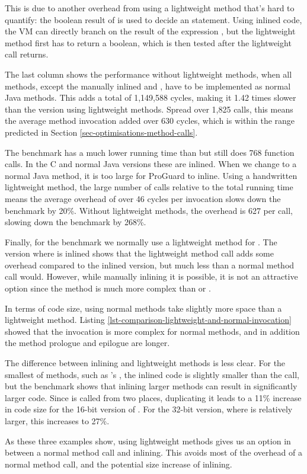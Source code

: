 This is due to another overhead from using a lightweight method that's hard to quantify: the boolean result of  is used to decide an  statement. Using inlined code, the VM can directly branch on the result of the expression , but the lightweight method first has to return a boolean, which is then tested after the lightweight call returns.

The last column shows the performance without lightweight methods, when all methods, except the manually inlined  and , have to be implemented as normal Java methods. This adds a total of 1,149,588 cycles, making it 1.42 times slower than the version using lightweight methods. Spread over 1,825 calls, this means the average method invocation added over 630 cycles, which is within the range predicted in Section \ref{sec-optimisations-method-calls}.

The  benchmark has a much lower running time than  but still does 768 function calls. In the C and normal Java versions these are inlined. When we change  to a normal Java method, it is too large for ProGuard to inline. Using a handwritten lightweight method, the large number of calls relative to the total running time means the average overhead of over 46 cycles per invocation slows down the benchmark by 20\%. Without lightweight methods, the overhead is 627 per call, slowing down the benchmark by 268\%.

Finally, for the  benchmark we normally use a lightweight method for . The version where  is inlined shows that the lightweight method call adds some overhead compared to the inlined version, but much less than a normal method call would. However, while manually inlining it is possible, it is not an attractive option since the  method is much more complex than  or .

In terms of code size, using normal methods take slightly more space than a lightweight method. Listing \ref{lst-comparison-lightweight-and-normal-invocation} showed that the invocation is more complex for normal methods, and in addition the method prologue and epilogue are longer.

The difference between inlining and lightweight methods is less clear. For the smallest of methods, such as 's , the inlined code is slightly smaller than the call, but the  benchmark shows that inlining larger methods can result in significantly larger code. Since  is called from two places, duplicating it leads to a 11\% increase in code size for the 16-bit version of . For the 32-bit version, where  is relatively larger, this increases to 27\%.

As these three examples show, using lightweight methods gives us an option in between a normal method call and inlining. This avoids most of the overhead of a normal method call, and the potential size increase of inlining.


